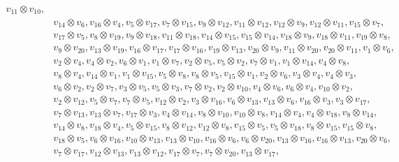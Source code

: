 \documentclass[pdftex]{sigma}
\numberwithin{equation}{section}
\theoremstyle{definition}
\begin{document}
\begin{align*}
v_{11} \otimes v_{10}, \\
&v_{14} \otimes v_{6},
v_{16} \otimes v_{4},
v_{5} \otimes v_{17},
v_{7} \otimes v_{15},
v_{9} \otimes v_{12},
v_{11} \otimes v_{12},
v_{12} \otimes v_{9},
v_{12} \otimes v_{11},
v_{15} \otimes v_{7}, \\
&v_{17} \otimes v_{5},
v_{8} \otimes v_{19},
v_{9} \otimes v_{18},
v_{11} \otimes v_{18},
v_{14} \otimes v_{15},
v_{15} \otimes v_{14},
v_{18} \otimes v_{9},
v_{18} \otimes v_{11},
v_{19} \otimes v_{8}, \\
&v_{9} \otimes v_{20},
v_{13} \otimes v_{19},
v_{16} \otimes v_{17},
v_{17} \otimes v_{16},
v_{19} \otimes v_{13},
v_{20} \otimes v_{9},
v_{11} \otimes v_{20},
v_{20} \otimes v_{11},
v_{1} \otimes v_{6}, \\
&v_{2} \otimes v_{4},
v_{4} \otimes v_{2},
v_{6} \otimes v_{1},
v_{1} \otimes v_{7},
v_{2} \otimes v_{5},
v_{5} \otimes v_{2},
v_{7} \otimes v_{1},
v_{1} \otimes v_{14},
v_{4} \otimes v_{8}, \\
&v_{8} \otimes v_{4},
v_{14} \otimes v_{1},
v_{1} \otimes v_{15},
v_{5} \otimes v_{8},
v_{8} \otimes v_{5},
v_{15} \otimes v_{1},
v_{2} \otimes v_{6},
v_{3} \otimes v_{4},
v_{4} \otimes v_{3}, \\
&v_{6} \otimes v_{2},
v_{2} \otimes v_{7},
v_{3} \otimes v_{5},
v_{5} \otimes v_{3},
v_{7} \otimes v_{2},
v_{2} \otimes v_{10},
v_{4} \otimes v_{6},
v_{6} \otimes v_{4},
v_{10} \otimes v_{2}, \\
&v_{2} \otimes v_{12},
v_{5} \otimes v_{7},
v_{7} \otimes v_{5},
v_{12} \otimes v_{2},
v_{3} \otimes v_{16},
v_{6} \otimes v_{13},
v_{13} \otimes v_{6},
v_{16} \otimes v_{3},
v_{3} \otimes v_{17}, \\
&v_{7} \otimes v_{13},
v_{13} \otimes v_{7},
v_{17} \otimes v_{3},
v_{4} \otimes v_{14},
v_{8} \otimes v_{10},
v_{10} \otimes v_{8},
v_{14} \otimes v_{4},
v_{4} \otimes v_{18},
v_{8} \otimes v_{14}, \\
&v_{14} \otimes v_{8},
v_{18} \otimes v_{4},
v_{5} \otimes v_{15},
v_{8} \otimes v_{12},
v_{12} \otimes v_{8},
v_{15} \otimes v_{5},
v_{5} \otimes v_{18},
v_{8} \otimes v_{15},
v_{15} \otimes v_{8}, \\
&v_{18} \otimes v_{5},
v_{6} \otimes v_{16},
v_{10} \otimes v_{13},
v_{13} \otimes v_{10},
v_{16} \otimes v_{6},
v_{6} \otimes v_{20},
v_{13} \otimes v_{16},
v_{16} \otimes v_{13},
v_{20} \otimes v_{6}, \\
&v_{7} \otimes v_{17},
v_{12} \otimes v_{13},
v_{13} \otimes v_{12},
v_{17} \otimes v_{7},
v_{7} \otimes v_{20},
v_{13} \otimes v_{17},

\end{align*}
\end{document}
